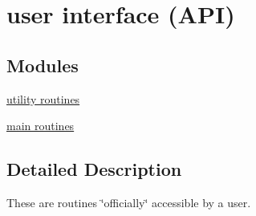\hypertarget{group__matmap__group1}{\section{user interface (A\-P\-I)}
\label{group__matmap__group1}
}
\subsection*{Modules}
\begin{DoxyCompactItemize}
\item 
\hyperlink{group__matmap__group11}{utility routines}
\item 
\hyperlink{group__matmap__group12}{main routines}
\end{DoxyCompactItemize}


\subsection{Detailed Description}
These are routines \char`\"{}officially\char`\"{} accessible by a user. 